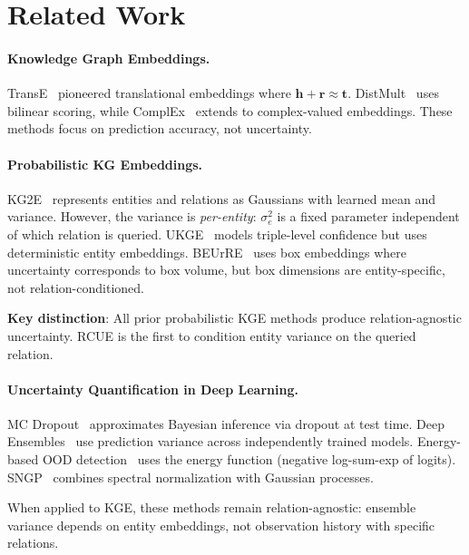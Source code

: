 \section{Related Work}
\label{sec:related}

\paragraph{Knowledge Graph Embeddings.}
TransE~\citep{bordes2013translating} pioneered translational embeddings where $\mathbf{h} + \mathbf{r} \approx \mathbf{t}$. DistMult~\citep{yang2015embedding} uses bilinear scoring, while ComplEx~\citep{trouillon2016complex} extends to complex-valued embeddings. These methods focus on prediction accuracy, not uncertainty.

\paragraph{Probabilistic KG Embeddings.}
KG2E~\citep{he2015learning} represents entities and relations as Gaussians with learned mean and variance. However, the variance is \emph{per-entity}: $\sigma^2_e$ is a fixed parameter independent of which relation is queried. UKGE~\citep{chen2019embedding} models triple-level confidence but uses deterministic entity embeddings. BEUrRE~\citep{chen2021probabilistic} uses box embeddings where uncertainty corresponds to box volume, but box dimensions are entity-specific, not relation-conditioned.

\textbf{Key distinction}: All prior probabilistic KGE methods produce relation-agnostic uncertainty. RCUE is the first to condition entity variance on the queried relation.

\paragraph{Uncertainty Quantification in Deep Learning.}
MC Dropout~\citep{gal2016dropout} approximates Bayesian inference via dropout at test time. Deep Ensembles~\citep{lakshminarayanan2017simple} use prediction variance across independently trained models. Energy-based OOD detection~\citep{liu2020energy} uses the energy function (negative log-sum-exp of logits). SNGP~\citep{liu2020simple} combines spectral normalization with Gaussian processes.

When applied to KGE, these methods remain relation-agnostic: ensemble variance depends on entity embeddings, not observation history with specific relations.

